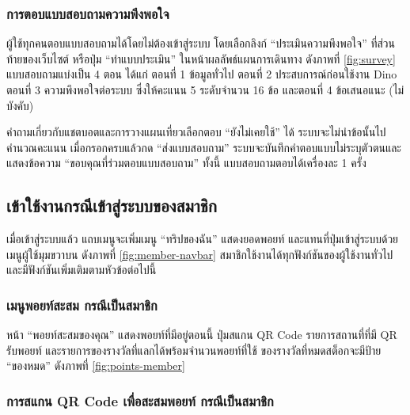 \subsubsection{การตอบแบบสอบถามความพึงพอใจ}

ผู้ใช้ทุกคนตอบแบบสอบถามได้โดยไม่ต้องเข้าสู่ระบบ โดยเลือกลิงก์ ``ประเมินความพึงพอใจ'' ที่ส่วนท้ายของเว็บไซต์ หรือปุ่ม ``ทำแบบประเมิน'' ในหน้าผลลัพธ์แผนการเดินทาง ดังภาพที่ \ref{fig:survey} แบบสอบถามแบ่งเป็น 4 ตอน ได้แก่ ตอนที่ 1 ข้อมูลทั่วไป ตอนที่ 2 ประสบการณ์ก่อนใช้งาน Dino ตอนที่ 3 ความพึงพอใจต่อระบบ ซึ่งให้คะแนน 5 ระดับจำนวน 16 ข้อ และตอนที่ 4 ข้อเสนอแนะ (ไม่บังคับ)


คำถามเกี่ยวกับแชตบอตและการวางแผนเที่ยวเลือกตอบ ``ยังไม่เคยใช้'' ได้ ระบบจะไม่นำข้อนั้นไปคำนวณคะแนน เมื่อกรอกครบแล้วกด ``ส่งแบบสอบถาม'' ระบบจะบันทึกคำตอบแบบไม่ระบุตัวตนและแสดงข้อความ ``ขอบคุณที่ร่วมตอบแบบสอบถาม'' ทั้งนี้ แบบสอบถามตอบได้เครื่องละ 1 ครั้ง

\subsection{เข้าใช้งานกรณีเข้าสู่ระบบของสมาชิก}

เมื่อเข้าสู่ระบบแล้ว แถบเมนูจะเพิ่มเมนู ``ทริปของฉัน'' แสดงยอดพอยท์ และแทนที่ปุ่มเข้าสู่ระบบด้วยเมนูผู้ใช้มุมขวาบน ดังภาพที่ \ref{fig:member-navbar} สมาชิกใช้งานได้ทุกฟังก์ชันของผู้ใช้งานทั่วไป และมีฟังก์ชันเพิ่มเติมตามหัวข้อต่อไปนี้


\subsubsection{เมนูพอยท์สะสม กรณีเป็นสมาชิก}

หน้า ``พอยท์สะสมของคุณ'' แสดงพอยท์ที่มีอยู่ตอนนี้ ปุ่มสแกน QR Code รายการสถานที่ที่มี QR รับพอยท์ และรายการของรางวัลที่แลกได้พร้อมจำนวนพอยท์ที่ใช้ ของรางวัลที่หมดสต็อกจะมีป้าย ``ของหมด'' ดังภาพที่ \ref{fig:points-member}


\subsubsection{การสแกน QR Code เพื่อสะสมพอยท์ กรณีเป็นสมาชิก}

